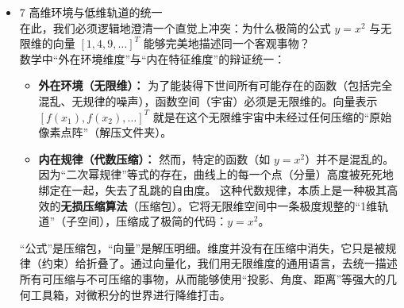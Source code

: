 \documentclass[12pt]{article}
\begin{document}
\begin{flushleft}
\begin{itemize}
              那么  $<f, g> =  \int_{a}^{b}f(x)g(x) \,dx$ 是否满足双线性 + 正定性呢？ \\
              \begin{align}
                  <f, g>  =  \int_{a}^{b}f(x)g(x) \,dx =  \int_{a}^{b}g(x)f(x)  \,dx   \;\; a      \\
                  <f, f>  =  \int_{a}^{b}f^{2}(x) \,dx                                      \;\; b \\
                  <(f + g),w > = \int_{a}^{b}f(x)w(x) \,dx  + \int_{a}^{b}g(x)w(x) \,dx  \;\;c     \\
              \end{align}
              $a \to \text{乘法的交换律} $ \\
              $b \to  f^{2}(x) \ge 0,\text{积分也一定大于0, 当 f(x) = 0 时 积分为 0} $ \\
              $c \to \text{积分是线性的,也就是一个大的积分可以拆成两个小积分相加}$ \\
              上面 a, b, c 再次证明了一个核心数学哲理思想: 是几何在选择代数表达(乘法的交换率, 因为内积是存在对称性的所有自然是选择了"乘法"(有结构上的约束) 在高维依然是成立) \\


        \item 7 高维环境与低维轨道的统一 \\

              在此，我们必须逻辑地澄清一个直觉上冲突：为什么极简的公式 $y = x^2$ 与无限维的向量 $[1, 4, 9, \dots]^T$ 能够完美地描述同一个客观事物？ \\
              数学中“外在环境维度”与“内在特征维度”的辩证统一：
              \begin{itemize}
                  \item \textbf{外在环境（无限维）：}
                        为了能装得下世间所有可能存在的函数（包括完全混乱、无规律的噪声），函数空间（宇宙）必须是无限维的。向量表示 $[f(x_1), f(x_2), \dots]^T$ 就是在这个无限维宇宙中未经过任何压缩的“原始像素点阵”（解压文件夹）。

                  \item \textbf{内在规律（代数压缩）：}
                        然而，特定的函数（如 $y = x^2$）并不是混乱的。因为“二次幂规律”等式的存在，曲线上的每一个点（分量）高度被死死地绑定在一起，失去了乱跳的自由度。
                        这种代数规律，本质上是一种极其高效的\textbf{无损压缩算法}（压缩包）。它将无限维空间中一条极度规整的“1维轨道”（子空间），压缩成了极简的代码：$y = x^2$。
              \end{itemize}
              “公式”是压缩包，“向量”是解压明细。维度并没有在压缩中消失，它只是被规律（约束）给折叠了。通过向量化，我们用无限维度的通用语言，去统一描述所有可压缩与不可压缩的事物，从而能够使用“投影、角度、距离”等强大的几何工具箱，对微积分的世界进行降维打击。

    \end{itemize}
\end{flushleft}
\end{document}
